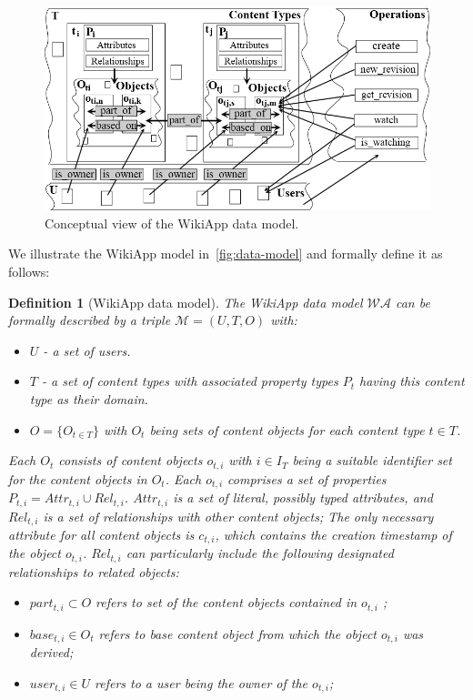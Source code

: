 \documentclass[PhD, Submit, ngerman,UKenglish,table]{scrbook}
\newtheorem{definition}{Definition}
\begin{document}
\begin{figure}[htb]
	\centering
		\includegraphics[width=.8\columnwidth]{images/data_model_last.png}
	\caption{Conceptual view of the WikiApp data model.}
	\label{fig:data-model}
\end{figure}

We illustrate the WikiApp model in~\autoref{fig:data-model} and formally define it as follows:

\begin{definition}[WikiApp data model]
\label{def:dm}
The WikiApp data model $\mathcal{WA}$ can be formally described by a triple $\mathcal{M}=(U,T,O)$ with:
\begin{itemize}
	\item $U$ - a set of \emph{users}.
	\item $T$ - a set of \emph{content types} with associated property types $P_t$ having this content type as their domain.
	\item $O=\{O_{t \in T}\}$ with $O_t$ being \emph{sets of content objects} for each content type $t \in T$.
\end{itemize}
	Each $O_t$ consists of content objects $o_{t,i}$ with $i \in I_T$ being a suitable \emph{identifier} set for the content objects in $O_t$.
	Each $o_{t,i}$ comprises a set of properties $P_{t,i} = Attr_{t,i} \cup Rel_{t,i}$.
	$Attr_{t,i}$ is a set of literal, possibly typed \emph{attributes}, and $Rel_{t,i}$ is a set of \emph{relationships} with other content objects;
	The only necessary attribute for all content objects is $c_{t,i}$, which contains the creation timestamp of the object $o_{t,i}$.
	$Rel_{t,i}$ can particularly include the following designated relationships to related objects:
	\begin{itemize}
		\item $part_{t,i} \subset O$ refers to \emph{set of the content objects} contained in $o_{t,i}$ ;
		\item $base_{t,i} \in O_t$ refers to \emph{base content object} from which the object $o_{t,i}$ was derived;
		\item $user_{t,i} \in U$ refers to a user being the \emph{owner} of the $o_{t,i}$;		
	\end{itemize}
\end{definition}
\end{document}
